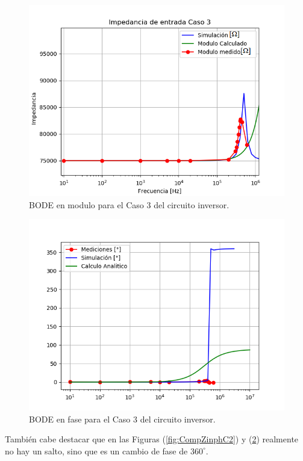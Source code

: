 \begin{figure}[H]	
	\centering
	\includegraphics[width=\textwidth]{Ejercicio1/Imagenes/CZinC3.png}
	\caption{BODE en modulo para el Caso 3 del circuito inversor.}
	\label{fig:CompZinC3}
\end{figure} 

\begin{figure}[H]	
	\centering
	\includegraphics[width=\textwidth]{Ejercicio1/Imagenes/ZinphC3.png}
	\caption{BODE en fase para el Caso 3 del circuito inversor.}
	\label{fig:CompZinphC3}
\end{figure}

También cabe destacar que en las Figuras (\ref{fig:CompZinphC2}) y (\ref{fig:CompZinphC3}) realmente no hay un salto, sino que es un cambio de fase de $360^{\circ}$.

